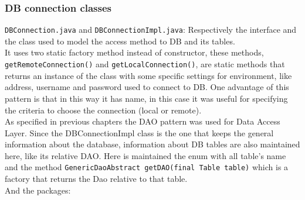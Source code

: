 \documentclass[a4paper,12pt]{report}
\begin{document}
\subsubsection{DB connection classes}
\texttt{DBConnection.java} and \texttt{DBConnectionImpl.java}: Respectively the interface and the class used to model the access method to DB and its tables.\\
It uses two static factory method instead of constructor, these methods, \\ \texttt{getRemoteConnection()} and \texttt{getLocalConnection()}, are static methods that returns an instance of the class with some specific settings for environment, like address, username and password used to connect to DB. One advantage of this pattern is that in this way it has name, in this case it was useful for specifying the criteria to choose the connection (local or remote).\\
As specified in previous chapters the DAO pattern was used for Data Access Layer. Since the DBConnectionImpl class is the one that keeps the general information about the database, information about DB tables are also maintained here, like its relative DAO. Here is maintained the enum with all table's name and the method \texttt{GenericDaoAbstract getDAO(final Table table)} which is a factory that returns the Dao relative to that table.\\

And the packages:\\
\end{document}
